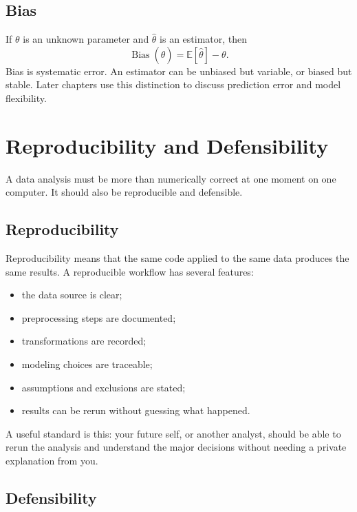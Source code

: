 {\subsection{Bias}

If $\theta$ is an unknown parameter and $\widehat{\theta}$ is an estimator, then
\begin{equation}
  \operatorname{Bias}(\widehat{\theta})=\mathbb{E}[\widehat{\theta}]-\theta.
\end{equation}
Bias is systematic error.  An estimator can be unbiased but variable, or biased but stable.  Later chapters use this distinction to discuss prediction error and model flexibility.
}
\section{Reproducibility and Defensibility}

A data analysis must be more than numerically correct at one moment on one computer.  It should also be reproducible and defensible.

\subsection{Reproducibility}

Reproducibility means that the same code applied to the same data produces the same results.  A reproducible workflow has several features:
\begin{itemize}
  \item the data source is clear;
  \item preprocessing steps are documented;
  \item transformations are recorded;
  \item modeling choices are traceable;
  \item assumptions and exclusions are stated;
  \item results can be rerun without guessing what happened.
\end{itemize}

A useful standard is this: your future self, or another analyst, should be able to rerun the analysis and understand the major decisions without needing a private explanation from you.

\subsection{Defensibility}

